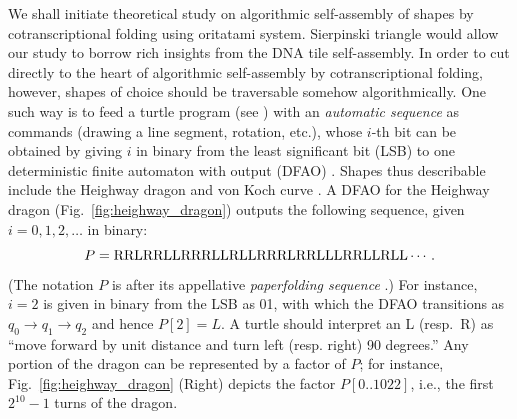 We shall initiate theoretical study on algorithmic self-assembly of shapes by cotranscriptional folding using oritatami system. 
Sierpinski triangle would allow our study to borrow rich insights from the DNA tile self-assembly. 
In order to cut directly to the heart of algorithmic self-assembly by cotranscriptional folding, however, shapes of choice should be traversable somehow algorithmically. 
One such way is to feed a turtle program (see \cite{AbelsondiSessa1981}) with an \textit{automatic sequence} as commands (drawing a line segment, rotation, etc.), whose $i$-th bit can be obtained by giving $i$ in binary from the least significant bit (LSB) to one deterministic finite automaton with output (DFAO) \cite{AlloucheShallit2003}.
Shapes thus describable include the Heighway dragon \cite{AlloucheShallit2003} and von Koch curve \cite{MaHoldener2005}. 
A DFAO for the Heighway dragon (Fig.~\ref{fig:heighway_dragon}) outputs the following sequence, given $i = 0, 1, 2, \ldots$ in binary: 
\[
P 	= {\rm RRLRRLLRRRLLRLLRRRLRRLLLRRLLRLL} \cdots.
\]
(The notation $P$ is after its appellative \textit{paperfolding sequence} \cite{AlloucheShallit2003}.) 
For instance, $i = 2$ is given in binary from the LSB as 01, with which the DFAO transitions as $q_0 \to q_1 \to q_2$ and hence $P[2] = L$. 
A turtle should interpret an L (resp.~R) as ``move forward by unit distance and turn left (resp. right) 90 degrees.''
Any portion of the dragon can be represented by a factor of $P$; for instance, Fig.~\ref{fig:heighway_dragon} (Right) depicts the factor $P[0 .. 1022]$, i.e., the first $2^{10}-1$ turns of the dragon. 

